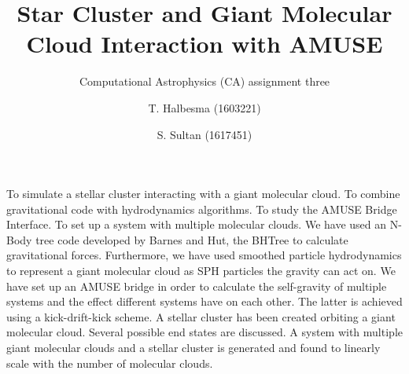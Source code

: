 \documentclass{aa}
\begin{document}
   \title{Star Cluster and Giant Molecular Cloud Interaction with AMUSE}

   \subtitle{Computational Astrophysics (CA) assignment three}

   \author{T. Halbesma (1603221)
          \and
          S. Sultan (1617451)
          }




  \abstract
   {}
   {To simulate a stellar cluster interacting with a giant molecular cloud. To combine gravitational code with hydrodynamics algorithms. To study the AMUSE Bridge Interface. To set up a system with multiple molecular clouds.}
   {We have used an N-Body tree code developed by Barnes and Hut, the BHTree to calculate gravitational forces. Furthermore, we have used smoothed particle hydrodynamics to represent a giant molecular cloud as SPH particles the gravity can act on. We have set up an AMUSE bridge in order to calculate the self-gravity of multiple systems and the effect different systems have on each other. The latter is achieved using a kick-drift-kick scheme.}
   {A stellar cluster has been created orbiting a giant molecular cloud. Several possible end states are discussed. A system with multiple giant molecular clouds and a stellar cluster is generated and found to linearly scale with the number of molecular clouds.}
   {}


   \maketitle
%
\end{document}
